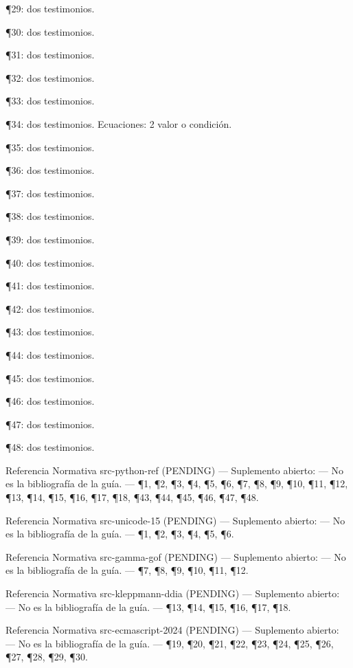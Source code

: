 \documentclass{book}
\begin{document}
\noindent ¶29: dos testimonios.

\noindent ¶30: dos testimonios.

\noindent ¶31: dos testimonios.

\noindent ¶32: dos testimonios.

\noindent ¶33: dos testimonios.

\noindent ¶34: dos testimonios. Ecuaciones: 2 valor o condición.

\noindent ¶35: dos testimonios.

\noindent ¶36: dos testimonios.

\noindent ¶37: dos testimonios.

\noindent ¶38: dos testimonios.

\noindent ¶39: dos testimonios.

\noindent ¶40: dos testimonios.

\noindent ¶41: dos testimonios.

\noindent ¶42: dos testimonios.

\noindent ¶43: dos testimonios.

\noindent ¶44: dos testimonios.

\noindent ¶45: dos testimonios.

\noindent ¶46: dos testimonios.

\noindent ¶47: dos testimonios.

\noindent ¶48: dos testimonios.

\medskip

\noindent Referencia Normativa src-python-ref (PENDING) --- Suplemento abierto: --- No es la bibliografía de la guía. --- \P1, \P2, \P3, \P4, \P5, \P6, \P7, \P8, \P9, \P10, \P11, \P12, \P13, \P14, \P15, \P16, \P17, \P18, \P43, \P44, \P45, \P46, \P47, \P48.

\noindent Referencia Normativa src-unicode-15 (PENDING) --- Suplemento abierto: --- No es la bibliografía de la guía. --- \P1, \P2, \P3, \P4, \P5, \P6.

\noindent Referencia Normativa src-gamma-gof (PENDING) --- Suplemento abierto: --- No es la bibliografía de la guía. --- \P7, \P8, \P9, \P10, \P11, \P12.

\noindent Referencia Normativa src-kleppmann-ddia (PENDING) --- Suplemento abierto: --- No es la bibliografía de la guía. --- \P13, \P14, \P15, \P16, \P17, \P18.

\noindent Referencia Normativa src-ecmascript-2024 (PENDING) --- Suplemento abierto: --- No es la bibliografía de la guía. --- \P19, \P20, \P21, \P22, \P23, \P24, \P25, \P26, \P27, \P28, \P29, \P30.
\end{document}
